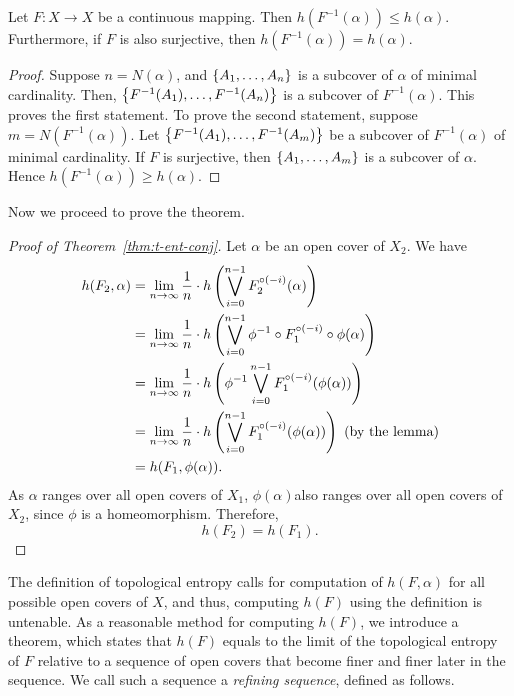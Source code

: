 \documentclass[12pt,twoside,draft]{book}
\begin{document}
\begin{lemma}
  Let $F: X\to X$ be a continuous mapping.
  Then $h(F^{-1}(\alpha)) \leq h(\alpha)$.
  Furthermore, if $F$ is also surjective, then $h(F^{-1}(\alpha)) = h(\alpha)$.
  \begin{proof}
    Suppose $n = N(\alpha)$, and $\left \{ A_1, \ldots, A_{n} \right \}$ is a subcover of $\alpha$ of minimal cardinality.
    Then, $\left \{ F^{-1}(A_1), \ldots, F^{-1}(A_{n}) \right \}$ is a subcover of $F^{-1}(\alpha)$.
    This proves the first statement.
    To prove the second statement, suppose $m = N(F^{-1}(\alpha))$.
    Let $\left \{ F^{-1}(A_1), \ldots, F^{-1}(A_{m}) \right \}$ be a subcover of $F^{-1}(\alpha)$ of minimal cardinality.
    If $F$ is surjective, then $\left \{ A_1, \ldots, A_{m} \right \}$ is a subcover of $\alpha$.
    Hence $h(F^{-1}(\alpha)) \geq h(\alpha)$.
  \end{proof}

\end{lemma}

Now we proceed to prove the theorem.
\begin{proof}[Proof of Theorem~\ref{thm:t-ent-conj}]
  Let $\alpha$ be an open cover of $X_2$.
  We have
  \begin{align*}
    h(F_2, \alpha)
    &= \lim\limits_{n \to \infty} \frac{1}{n} \cdot h \left ( \bigvee\limits_{i = 0}^{n-1} F_2^{\circ (-i)}(\alpha) \right ) \\
    &= \lim\limits_{n \to \infty} \frac{1}{n} \cdot h \left ( \bigvee\limits_{i = 0}^{n-1} \phi^{-1} \circ F_1^{\circ (-i)} \circ \phi (\alpha) \right ) \\
    &= \lim\limits_{n \to \infty} \frac{1}{n} \cdot h \left ( \phi^{-1} \bigvee\limits_{i = 0}^{n-1} F_1^{\circ (-i)} (\phi (\alpha)) \right ) \\
    &= \lim\limits_{n \to \infty} \frac{1}{n} \cdot h \left ( \bigvee\limits_{i = 0}^{n-1} F_1^{\circ (-i)} (\phi (\alpha)) \right ) \mbox{ (by the lemma)} \\
    &= h(F_1, \phi(\alpha)).
  \end{align*}
  As $\alpha$ ranges over all open covers of $X_1$, $\phi(\alpha)$also ranges over all open covers of $X_2$, since $\phi$ is a homeomorphism.
  Therefore,
  \begin{equation*}
    h(F_2) = h(F_1).
  \end{equation*}
\end{proof}

The definition of topological entropy calls for computation of $h(F,\alpha)$ for all possible open covers of $X$, and thus, computing $h(F)$ using the definition is untenable.
As a reasonable method for computing $h(F)$, we introduce a theorem, which states that $h(F)$ equals to the limit of the topological entropy of $F$ relative to a sequence of open covers that become finer and finer later in the sequence.
We call such a sequence a \textit{refining sequence}, defined as follows.
\end{document}
